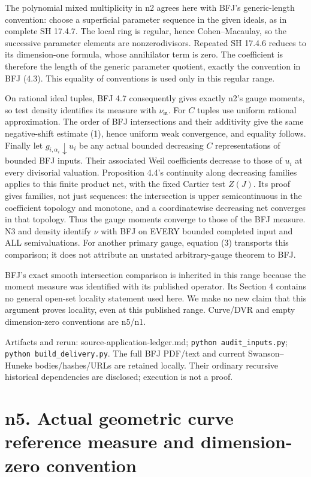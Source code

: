 \documentclass[
  11pt,
]{article}
\begin{document}
The polynomial mixed multiplicity in n2 agrees here with BFJ's
generic-length convention: choose a superficial parameter sequence in
the given ideals, as in complete SH 17.4.7. The local ring is regular,
hence Cohen--Macaulay, so the successive parameter elements are
nonzerodivisors. Repeated SH 17.4.6 reduces to its dimension-one
formula, whose annihilator term is zero. The coefficient is therefore
the length of the generic parameter quotient, exactly the convention in
BFJ (4.3). This equality of conventions is used only in this regular
range.

On rational ideal tuples, BFJ 4.7 consequently gives exactly n2's gauge
moments, so test density identifies its measure with
\(\nu_{\mathfrak m}\). For \(C\) tuples use uniform rational
approximation. The order of BFJ intersections and their additivity give
the same negative-shift estimate (1), hence uniform weak convergence,
and equality follows. Finally let \(g_{i,\alpha_i}\downarrow u_i\) be
any actual bounded decreasing \(C\) representations of bounded BFJ
inputs. Their associated Weil coefficients decrease to those of \(u_i\)
at every divisorial valuation. Proposition 4.4's continuity along
decreasing families applies to this finite product net, with the fixed
Cartier test \(Z(J)\). Its proof gives families, not just sequences: the
intersection is upper semicontinuous in the coefficient topology and
monotone, and a coordinatewise decreasing net converges in that
topology. Thus the gauge moments converge to those of the BFJ measure.
N3 and density identify \(\nu\) with BFJ on EVERY bounded completed
input and ALL semivaluations. For another primary gauge, equation (3)
transports this comparison; it does not attribute an unstated
arbitrary-gauge theorem to BFJ.

BFJ's exact smooth intersection comparison is inherited in this range
because the moment measure was identified with its published operator.
Its Section 4 contains no general open-set locality statement used here.
We make no new claim that this argument proves locality, even at this
published range. Curve/DVR and empty dimension-zero conventions are
n5/n1.

Artifacts and rerun: source-application-ledger.md;
\texttt{python\ audit\_inputs.py}; \texttt{python\ build\_delivery.py}.
The full BFJ PDF/text and current Swanson--Huneke bodies/hashes/URLs are
retained locally. Their ordinary recursive historical dependencies are
disclosed; execution is not a proof.

\section{n5. Actual geometric curve reference measure and dimension-zero
convention}\label{n5.-actual-geometric-curve-reference-measure-and-dimension-zero-convention}
\end{document}
